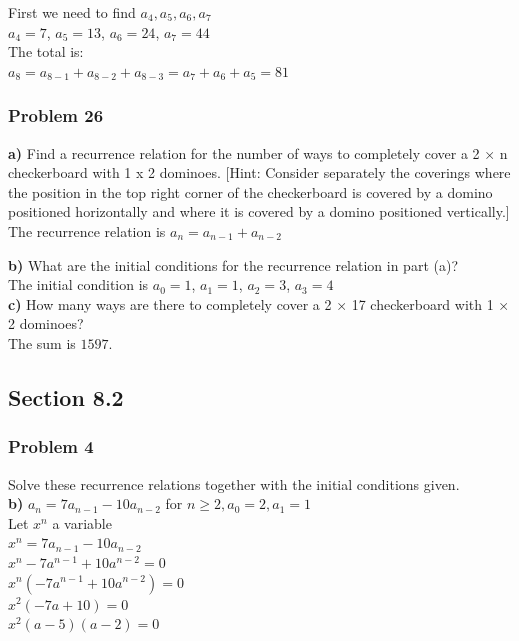 \documentclass[fontsize=11pt]{scrartcl} %
\begin{document}
First we need to find $a_4, a_5, a_6, a_7$\\
$a_4 = 7$, $a_5 = 13$, $a_6 = 24$, $a_7 = 44$\\

The total is:\\
$a_8 = a_{8-1} + a_{8-2} + a_{8-3} = a_{7} + a_{6} + a_{5} = 81$\\

\subsubsection*{Problem 26}
\textbf{a)} Find a recurrence relation for the number of ways to completely cover a 2 × n checkerboard with 1 x 2 dominoes. [Hint: Consider separately the coverings where the position in the top right corner of the checkerboard is covered by a domino positioned horizontally and where it is covered by a domino positioned vertically.]\\

The recurrence relation is $a_n = a_{n-1} + a_{n-2}$

\textbf{b)} What are the initial conditions for the recurrence relation in part (a)?\\

The initial condition is $a_0 = 1$, $a_1 = 1$, $a_2 = 3$, $a_3 = 4$\\

\textbf{c)} How many ways are there to completely cover a 2 × 17 checkerboard with 1 × 2 dominoes?\\

The sum is $1597$.\\

\subsection*{Section 8.2}
\subsubsection*{Problem 4}
Solve these recurrence relations together with the initial conditions given.\\

\textbf{b)} $a_n = 7a_{n-1} - 10a_{n-2}$ for $n \ge 2, a_0 = 2 , a_1 = 1$\\

Let $x^n$ a variable\\
$x^n = 7a_{n-1} - 10a_{n-2}$\\
$x^n -7a^{n-1} + 10a^{n-2} = 0$\\
$x^n (-7a^{n-1} + 10a^{n-2}) = 0$\\
$x^2 (-7a + 10) = 0$\\
$x^2  (a - 5)(a - 2) = 0$\\
\end{document}
